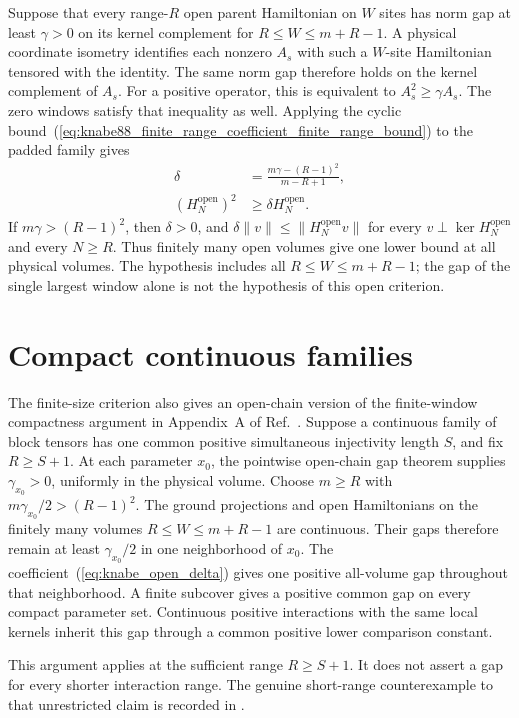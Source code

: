 \documentclass{article}
\begin{document}
Suppose that every range-$R$ open parent Hamiltonian on $W$ sites has
norm gap at least $\gamma>0$ on its kernel complement for
$R\leq W\leq m+R-1$. A physical coordinate isometry identifies each
nonzero $A_s$ with such a $W$-site Hamiltonian tensored with the identity.
The same norm gap therefore holds on the kernel complement of $A_s$.
For a positive operator, this is equivalent to $A_s^2\geq\gamma A_s$.
The zero windows satisfy that inequality as well. Applying the cyclic
bound~(\ref{eq:knabe88_finite_range_coefficient_finite_range_bound}) to the
padded family gives
\begin{align}
    \delta&=\frac{m\gamma-(R-1)^2}{m-R+1},
    \label{eq:knabe_open_delta}\\
    (H_N^{\mathrm{open}})^2
        &\geq\delta H_N^{\mathrm{open}}.
    \label{eq:knabe_open_gap}
\end{align}
If $m\gamma>(R-1)^2$, then $\delta>0$, and
$\delta\|v\|\leq\|H_N^{\mathrm{open}}v\|$ for every
$v\perp\ker H_N^{\mathrm{open}}$ and every $N\geq R$.
Thus finitely many open volumes give one lower bound at all physical
volumes. The hypothesis includes all $R\leq W\leq m+R-1$; the gap
of the single largest window alone is not the hypothesis of this open criterion.

\section{Compact continuous families}

The finite-size criterion also gives an open-chain version of the
finite-window compactness argument in Appendix~A of
Ref.~\cite{Schuch2011Phases}. Suppose a continuous family of block tensors
has one common positive simultaneous injectivity length $S$, and fix
$R\geq S+1$. At each parameter $x_0$, the pointwise open-chain gap theorem
supplies $\gamma_{x_0}>0$, uniformly in the physical volume.
Choose $m\geq R$ with $m\gamma_{x_0}/2>(R-1)^2$.
The ground projections and open Hamiltonians on the finitely many volumes
$R\leq W\leq m+R-1$ are continuous. Their gaps therefore remain at least
$\gamma_{x_0}/2$ in one neighborhood of $x_0$.
The coefficient~(\ref{eq:knabe_open_delta}) gives one positive all-volume gap throughout
that neighborhood. A finite subcover gives a positive common gap on every
compact parameter set. Continuous positive interactions with the same local
kernels inherit this gap through a common positive lower comparison constant.

This argument applies at the sufficient range $R\geq S+1$. It does not
assert a gap for every shorter interaction range. The genuine short-range
counterexample to that unrestricted claim is recorded in
.
\end{document}
